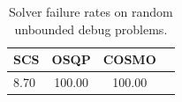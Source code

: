 \begin{table}
\centering
\caption{Solver failure rates on random unbounded debug problems.}
\label{t-random unbounded debug-failure}
\begin{tabular}{lccc}
\toprule
 SCS &   OSQP &  COSMO \\
\midrule
8.70 & 100.00 & 100.00 \\
\bottomrule
\end{tabular}
\end{table}
